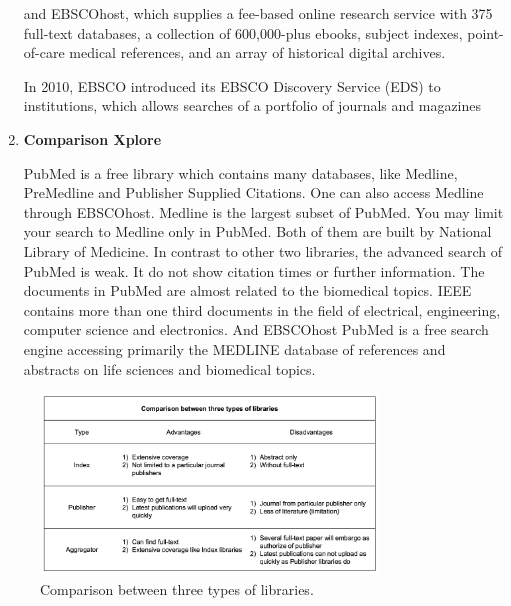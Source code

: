 \begin{enumerate}
    and EBSCOhost, which supplies a fee-based online research 
    service with 375 full-text databases, a collection
    of 600,000-plus ebooks, subject indexes, point-of-care 
    medical references, and an array of historical digital archives.

    In 2010, EBSCO introduced its EBSCO Discovery Service (EDS) to institutions,
    which allows searches of a portfolio of journals and magazines

	
	\item\textbf{Comparison Xplore}
	\setlength{\parindent}{1em}
	
	PubMed is a free library which contains many databases, like Medline, PreMedline and Publisher Supplied Citations.
    One can also access Medline through EBSCOhost. 
    Medline is the largest subset of PubMed. 
    You may limit your search to Medline only in PubMed. 
    Both of them are built by National Library of Medicine. 
    In contrast to other two libraries, the advanced search of PubMed is weak. 
    It do not show citation times or further information.
    The documents in PubMed are almost related to the biomedical topics.
    IEEE contains more than one third documents in the field of electrical, engineering, computer science and electronics.
    And EBSCOhost PubMed is a free search engine accessing primarily the MEDLINE 
    database of references and abstracts on life sciences and biomedical topics. 
    

\end{enumerate}


\begin{figure}[htb]
	\begin{center}
		\includegraphics[width=0.8\textwidth]{Wolverine_Background_Chart_1}
	\end{center}
	\caption{Comparison between three types of libraries.\label{WBC1}}
\end{figure}
\newpage
